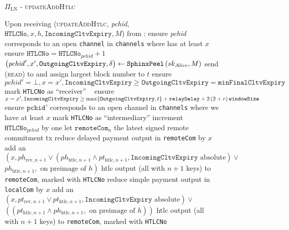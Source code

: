   \begin{figure}[H]
    \begin{protocolbox}{$\Pi_{\mathrm{LN}}$ - \textsc{updateAddHtlc}}
      \begin{algorithmic}[1]
        \State Upon receiving (\textsc{updateAddHtlc}, \textit{pchid},
        $\mathtt{HTLCNo}, x, h, \mathtt{IncomingCltvExpiry}, M$) from \bob:
        \Indent
          \State ensure \textit{pchid} corresponds to an open \texttt{channel}
          in \texttt{channels} where \bob{} has at least $x$
          \State ensure $\mathtt{HTLCNo} = \mathtt{HTLCNo}_{\mathit{pchid}} + 1$
          \State $\left(\mathit{pchid}', x', \mathtt{OutgoingCltvExpiry},
          \delta\right) \gets \mathtt{SphinxPeel}\left(sk_{\mathit{Alice}}, M\right)$
          \State send (\textsc{read}) to \ledger{} and assign largest block
          number to $t$
            \State ensure $\mathit{pchid}' = \bot, x = x',
            \mathtt{IncomingCltvExpiry} \geq \mathtt{OutgoingCltvExpiry} =
            \mathtt{minFinalCltvExpiry}$
            \State mark \texttt{HTLCNo} as ``receiver''
          \Else \ 
            \State ensure $x = x', \mathtt{IncomingCltvExpiry} \geq
            \max\{\mathtt{OutgoingCltvExpiry}, t\} + \mathtt{relayDelay} +
            2\left(2 + r\right)\texttt{windowSize}{}$
            \State ensure $\mathtt{pchid}'$ corresponds to an open channel in
            \texttt{channels} where we have at least $x$
            \State mark \texttt{HTLCNo} as ``intermediary''
          \EndIf
          \State increment $\mathtt{HTLCNo}_{\mathit{pchid}}$ by one
          \State let $\mathtt{remoteCom}_n$ the latest signed remote commitment
          tx
          \State reduce delayed payment output in \texttt{remoteCom} by $x$
          \State add an $\left(x, ph_{\mathrm{rev}, n+1} \vee
          \left(ph_{\mathrm{htlc}, n+1} \wedge pt_{\mathrm{htlc}, n+1},
          \mathtt{IncomingCltvExpiry} \text{ absolute}\right) \vee\right.$
          $\left.ph_{\mathrm{htlc}, n+1}, \text{ on preimage of } h\right)$ htlc
          output (all with $n+1$ keys) to \texttt{remoteCom}, marked with
          \texttt{HTLCNo}
          \State reduce simple payment output in \texttt{localCom} by $x$
          \State add an $\left(x, pt_{\mathrm{rev}, n+1} \vee pt_{\mathrm{htlc},
          n+1}, \mathtt{IncomingCltvExpiry} \text{ absolute}\right) \vee$
          $\left(\left(pt_{\mathrm{htlc}, n+1} \wedge ph_{\mathrm{htlc}, n+1},
          \text{ on preimage of } h\right)\right)$ htlc output (all with $n+1$
          keys) to \texttt{remoteCom}, marked with \texttt{HTLCNo}

\end{algorithmic}
\end{protocolbox}
\end{figure}
